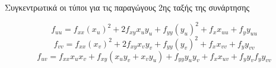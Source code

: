   \begin{rem}
    Συγκεντρωτικά οι τύποι για τις παραγώγους 2ης ταξής της συνάρτησης 

    \[
      f_{uu}= f_{xx}(x_{u})^{2}+ 2f_{xy}x_{u}y_{u} + f_{yy}(y_{u})^{2} + f_{x}x_{uu} + 
      f_{y}y_{uu} 
    \] 
    \[
      f_{vv}= f_{xx}(x_{v})^{2}+ 2f_{xy}x_{v}y_{v} + f_{yy}(y_{v})^{2} + f_{x}x_{vv} + 
      f_{y}y_{vv} 
    \]
    \[
      f_{uv}= f_{xx}x_{u}x_{v}+ f_{xy}(x_{u}y_{v} + x_{v}y_{u}) + 
      f_{yy}y_{u}y_{v} + f_{x}x_{uv} + f_{y}y_{v} 
      f_{y}y_{vv} 
    \]
  \end{rem}




